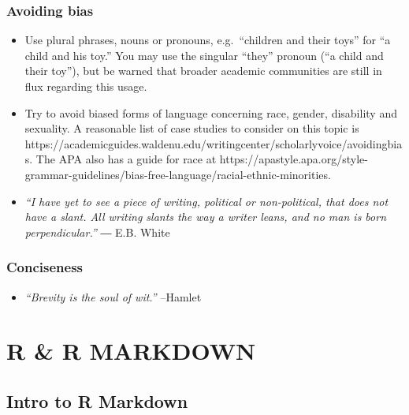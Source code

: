 \documentclass[
  letterpaper,
  DIV=11,
  numbers=noendperiod]{scrreprt}
\providecommand{\tightlist}{%
  \setlength{\itemsep}{0pt}\setlength{\parskip}{0pt}}\usepackage{longtable,booktabs,array}
\begin{document}
\hypertarget{avoiding-bias}{%
\section*{Avoiding bias}\label{avoiding-bias}}


\begin{itemize}
\tightlist
\item
  Use plural phrases, nouns or pronouns, e.g.~``children and their
  toys'' for ``a child and his toy.'' You may use the singular ``they''
  pronoun (``a child and their toy''), but be warned that broader
  academic communities are still in flux regarding this usage.
\item
  Try to avoid biased forms of language concerning race, gender,
  disability and sexuality. A reasonable list of case studies to
  consider on this topic is
  https://academicguides.waldenu.edu/writingcenter/scholarlyvoice/avoidingbias.
  The APA also has a guide for race at
  https://apastyle.apa.org/style-grammar-guidelines/bias-free-language/racial-ethnic-minorities.
\item
  \emph{``I have yet to see a piece of writing, political or
  non-political, that does not have a slant. All writing slants the way
  a writer leans, and no man is born perpendicular.''} ― E.B. White
\end{itemize}

\hypertarget{conciseness}{%
\section*{Conciseness}\label{conciseness}}


\begin{itemize}
\tightlist
\item
  \emph{``Brevity is the soul of wit.''} --Hamlet
\end{itemize}

\part{R \& R MARKDOWN}

\hypertarget{intro-to-r-markdown}{%
\chapter{Intro to R Markdown}\label{intro-to-r-markdown}}
\end{document}
